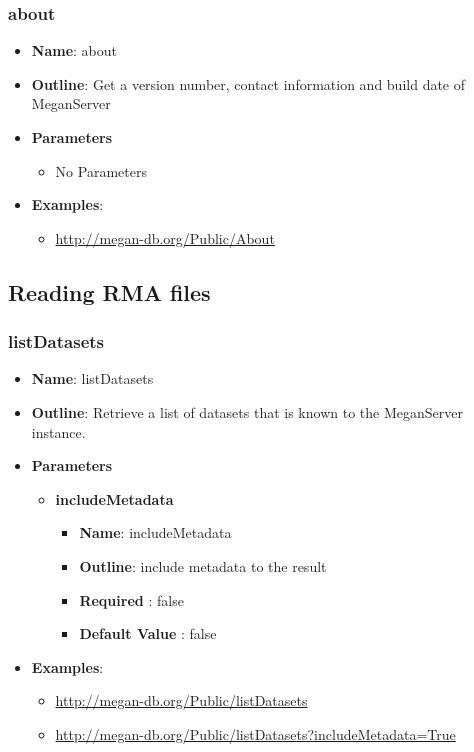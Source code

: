 \documentclass[11pt]{article}
\begin{document}
\subsubsection{about}

\begin{itemize}
	\item \textbf{Name}: about
	\item \textbf{Outline}: Get a version number, contact information and build date of MeganServer
	\item \textbf{Parameters}
		\begin{itemize}
			\item No Parameters
		\end{itemize}
	\item \textbf{Examples}:
		\begin{itemize}
			\item \url{http://megan-db.org/Public/About}
		\end{itemize}
\end{itemize}

\subsection{Reading RMA files}

\subsubsection{listDatasets}
\begin{itemize}
	\item \textbf{Name}: listDatasets
	\item \textbf{Outline}: Retrieve a list of datasets that is known to the MeganServer instance.
	\item \textbf{Parameters}
		\begin{itemize}
			\item \textbf{includeMetadata}
				\begin{itemize}
					\item \textbf{Name}: includeMetadata
					\item \textbf{Outline}: include metadata to the result
					\item \textbf{Required} : false
					\item \textbf{Default Value} : false
				\end{itemize}
		\end{itemize}
	\item \textbf{Examples}:
		\begin{itemize}
			\item \url{http://megan-db.org/Public/listDatasets}
			\item \url{http://megan-db.org/Public/listDatasets?includeMetadata=True}
		\end{itemize}
\end{itemize}
\end{document}
